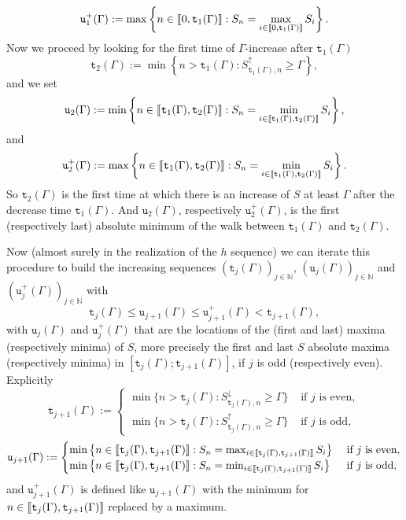 \documentclass[10pt]{amsart}
\theoremstyle{definition}\newtheorem{defi}[theo]{Definition}\newtheorem{rema}[theo]{Remark}\newtheorem{exam}[theo]{Example}\newtheorem{exem}[theo]{Example}\newtheorem{nota}[theo]{Notation}
\newcommand{\bbN}{\mathbb{N}}
\newcommand{\gG}{\Gamma}
\renewcommand*\ss{\mathtt{u}}
\newcommand{\ttt}{\mathtt{t}}
\newcommand{\tu}{\ss}
\newcommand{\tuplus}{\ss^+}
\newcommand{\llbracket}{\mathopen{[\mkern -2.7mu[}}
\newcommand{\rrbracket}{\mathclose{]\mkern -2.7mu]}}
\newcommand{\lbra}{\llbracket}
\newcommand{\rbra}{\rrbracket}
\begin{document}
\begin{equation}\label{eq:completenotation2.1}
\tuplus_1(\gG):= \max\left\{ n \in \lbra 0, \ttt_1(\gG)\rbra: S_n= \max_{i\in \lbra 0, \ttt_1(\gG)\rbra} S_i\right\}.
\end{equation}
Now we proceed by looking for the first time of $\gG$-increase after $ \ttt_1(\gG)$
\begin{equation}
\ttt_2(\gG):= \min\left\{n> \ttt_1(\gG): S^\uparrow_{\ttt_1(\gG),n} \ge \gG\right\},
\end{equation}
and we set
\begin{equation}
\tu_2(\gG) := \min\left\{n\in \lbra \ttt_1(\gG), \ttt_2(\gG)\rbra:S_n= \min_{i \in \lbra \ttt_1(\gG), \ttt_2(\gG)\rbra} S_i\right\},
\end{equation}
and
\begin{equation}
\tuplus_2(\gG) := \max\left\{n \in \lbra \ttt_1(\gG), \ttt_2(\gG)\rbra: S_n= \min_{i \in \lbra \ttt_1(\gG), \ttt_2(\gG)\rbra} S_i\right\}.
\end{equation}
So $\ttt_2(\gG)$ is the first time at which there is an increase of $S$ at least $\gG$ after the decrease time $\ttt_1(\gG)$. And $ \tu_2(\gG)$, respectively $\tuplus_2(\gG)$, is the first (respectively last) absolute minimum of the walk between $\ttt_1(\gG)$ and $\ttt_2(\gG)$.

Now (almost surely in the realization of the $h$ sequence) we can iterate this procedure to build the increasing sequences $(\ttt_j(\gG))_{j \in \bbN}$, $(\tu_j(\gG))_{j \in \bbN}$ and $(\tuplus_j(\gG))_{j \in \bbN}$ with
\begin{equation}
\ttt_j(\gG)  \le \tu_{j+1}(\gG) \le \tuplus_{j+1}(\gG) <  \ttt_{j+1}(\gG),
\end{equation}
with $\tu_j(\gG)$ and $ \tuplus_j(\gG)$ that are the locations of the (first and last) maxima (respectively minima) of $S$, more precisely the first and last $S$ absolute maxima (respectively minima) in $[\ttt_j(\gG); \ttt_{j+1}(\gG)]$, if $j$ is odd (respectively even). Explicitly
\begin{equation}
\ttt_{j+1}(\gG):=
\begin{cases}
\min\bigl\{n> \ttt_j(\gG): S^\downarrow_{\ttt_j(\gG),n} \ge \gG\bigr\} & \text{ if $j$ is even},
\\[0.2em]
\min\big\{n> \ttt_j(\gG): S^\uparrow_{\ttt_j(\gG),n} \ge \gG\big\} & \text{ if $j$ is odd},
\end{cases}
\end{equation}
\begin{equation}\label{eq:new-u}
\tu_{j+1}(\gG):=
\begin{cases}
\min\left\{n \in \lbra \ttt_j(\gG), \ttt_{j+1}(\gG)\rbra: S_n= \max_{i \in \lbra \ttt_j(\gG), \ttt_{j+1}(\gG)\rbra} S_i\right\} & \text{ if $j$ is even},
\\
\min\left\{n \in \lbra \ttt_j(\gG), \ttt_{j+1}(\gG)\rbra: S_n= \min_{i \in \lbra \ttt_j(\gG), \ttt_{j+1}(\gG)\rbra} S_i\right\} & \text{ if $j$ is odd},
\end{cases}
\end{equation}
and $\tu_{j+1}^+(\gG)$ is defined like $\tu_{j+1}(\gG)$ with the minimum for $n \in \lbra \ttt_j(\gG), \ttt_{j+1}(\gG)\rbra$ replaced by a maximum.
\end{document}
